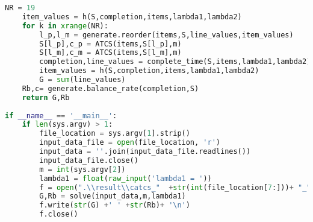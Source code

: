 \begin{lstlisting}[language = Python]
	NR = 19
	item_values = h(S,completion,items,lambda1,lambda2)
	for k in xrange(NR):
		l_p,l_m = generate.reorder(items,S,line_values,item_values)
		S[l_p],c_p = ATCS(items,S[l_p],m)
		S[l_m],c_m = ATCS(items,S[l_m],m)
		completion,line_values = complete_time(S,items,lambda1,lambda2)
		item_values = h(S,completion,items,lambda1,lambda2)
		G = sum(line_values)
	Rb,c= generate.balance_rate(completion,S)
	return G,Rb
	
if __name__ == '__main__':
	if len(sys.argv) > 1:
		file_location = sys.argv[1].strip()
		input_data_file = open(file_location, 'r')
		input_data = ''.join(input_data_file.readlines())
		input_data_file.close()
		m = int(sys.argv[2])
		lambda1 = float(raw_input('lambda1 = '))
		f = open(".\\result\\catcs_"  +str(int(file_location[7:]))+ "_" + str(m) + "_" + str(lambda1),'w')
		G,Rb = solve(input_data,m,lambda1)
		f.write(str(G) +' ' +str(Rb)+ '\n')
		f.close()
\end{lstlisting}